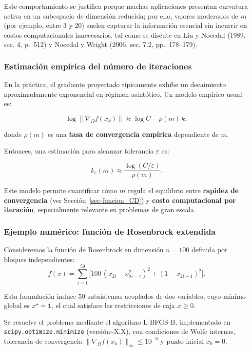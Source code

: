 \documentclass[
  spanish,
  us-letterpaper,
]{scrreprt}
\numberwithin{equation}{section}
\begin{document}
Este comportamiento se justifica porque muchas aplicaciones presentan
curvatura activa en un subespacio de dimensión reducida; por ello,
valores moderados de \(m\) (por ejemplo, entre 3 y 20) suelen capturar
la información esencial sin incurrir en costos computacionales
innecesarios, tal como se discute en Liu y Nocedal (1989, sec. 4,
p.~512) y Nocedal y Wright (2006, sec. 7.2, pp.~178--179).

\subsubsection{Estimación empírica del número de
iteraciones}\label{estimaciuxf3n-empuxedrica-del-nuxfamero-de-iteraciones}

En la práctica, el gradiente proyectado típicamente exhibe un
decaimiento aproximadamente exponencial en régimen asintótico. Un modelo
empírico usual es:

\[
\log \|\nabla_\Omega f(x_k)\| \approx \log C - \rho(m)\, k,
\]

donde \(\rho(m)\) es una \textbf{tasa de convergencia empírica}
dependiente de \(m\).

Entonces, una estimación para alcanzar tolerancia \(\varepsilon\) es:

\[
k_{\varepsilon}(m) \approx \frac{\log(C/\varepsilon)}{\rho(m)}.
\]

Este modelo permite cuantificar cómo \(m\) regula el equilibrio entre
\textbf{rapidez de convergencia} (ver Sección~\ref{sec-funcion_CD}) y
\textbf{costo computacional por iteración}, especialmente relevante en
problemas de gran escala.

\subsubsection{Ejemplo numérico: función de Rosenbrock
extendida}\label{ejemplo-numuxe9rico-funciuxf3n-de-rosenbrock-extendida}

Consideremos la función de Rosenbrock en dimensión \(n=100\) definida
por bloques independientes: \[
f(x) = \sum_{i=1}^{50} \Big[ 100\,(x_{2i} - x_{2i-1}^2)^2 + (1 - x_{2i-1})^2 \Big].
\]

Esta formulación induce 50 subsistemas acoplados de dos variables, cuyo
mínimo global es \(x^\star = \mathbf{1}\), el cual satisface las
restricciones de caja \(x \ge 0\).

Se resuelve el problema mediante el algoritmo L-BFGS-B, implementado en
\texttt{scipy.optimize.minimize} (versión\textasciitilde X.X), con
condiciones de Wolfe internas, tolerancia de convergencia
\(\|\nabla_\Omega f(x_k)\|_\infty \le 10^{-6}\) y punto inicial
\(x_0 = 0\).
\end{document}
